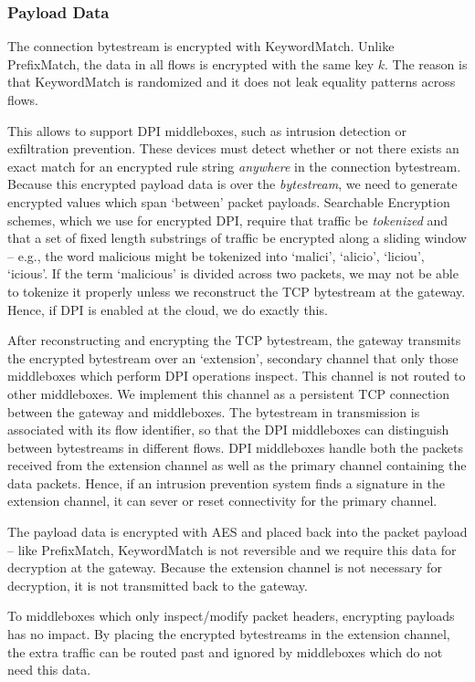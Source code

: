 \subsubsection{Payload Data} 
The connection bytestream is encrypted with KeywordMatch. Unlike PrefixMatch, the data in all flows is encrypted with the same key $k$. The reason is that KeywordMatch is randomized and it does not leak equality patterns across flows.

This allows \sys to support DPI middleboxes, such as intrusion detection or exfiltration prevention.
These devices must detect whether or not there exists an exact match for an encrypted rule string {\it anywhere} in the connection bytestream.
Because this encrypted payload data is over the {\it bytestream}, we need to generate encrypted values which span `between' packet payloads. 
Searchable Encryption schemes, which we use for encrypted DPI, require that traffic be {\it tokenized} and that a set of fixed length substrings of traffic be encrypted along a sliding window -- e.g., the word malicious might be tokenized into {`malici', `alicio', `liciou', `icious'}.
If the term `malicious' is divided across two packets, we may not be able to tokenize it properly unless we reconstruct the TCP bytestream at the gateway. Hence, if DPI is enabled at the cloud, we do exactly this.

After reconstructing and encrypting the TCP bytestream, the gateway transmits the encrypted bytestream over 
an `extension', secondary channel that only those middleboxes which perform DPI operations inspect. 
This channel is not routed to other middleboxes. We implement this channel as a persistent TCP connection 
between the gateway and middleboxes. The bytestream in transmission is associated with its flow identifier, 
so that the DPI middleboxes can distinguish between bytestreams in different flows.
DPI middleboxes handle both the packets received from the extension channel as well as the primary channel containing the data packets. 
Hence, if an intrusion prevention system finds a signature in the extension channel, it can sever or reset connectivity for the primary channel.

 The payload data is encrypted with AES and placed back into the packet payload -- like PrefixMatch, KeywordMatch is not reversible and we require this data for decryption at the gateway.
Because the extension channel is not necessary for decryption, it is not transmitted back to the gateway.

 To middleboxes which only inspect/modify packet headers, encrypting payloads has no impact. 
By placing the encrypted bytestreams in the extension channel, the extra traffic can be routed past and ignored by middleboxes which do not need this data. %

